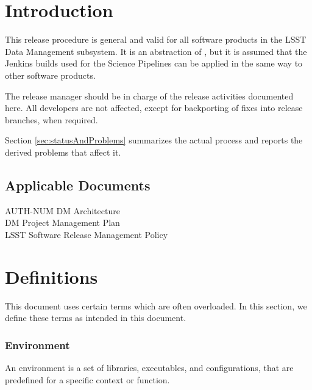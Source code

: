 \section{Introduction} \label{sec:intro}

This release procedure is general and valid for all software products in the LSST Data Management subsystem.
It is an abstraction of , but it is assumed that the Jenkins builds used for the Science Pipelines can be applied in the same way to other software products. 

The release manager should be in charge of the release activities documented here.  
All developers are not affected, except for backporting of fixes into release branches, when required.

Section \ref{sec:statusAndProblems} summarizes the actual process and reports the derived problems that affect it.


\subsection{Applicable Documents}

\begin{tabbing}
AUTH-NUM\= \kill
{} \>     DM Architecture\\
 \>     DM Project Management Plan   \\
 \>     LSST Software Release Management Policy \\
\end{tabbing}


\newpage
\section{Definitions} \label{sec:definitions}

This document uses certain terms which are often overloaded. In this section, we define these terms as intended in this document.


\subsubsection{Environment} \label{sec:envdef}

An environment is a set of libraries, executables, and configurations, that are predefined for a specific context or function.

